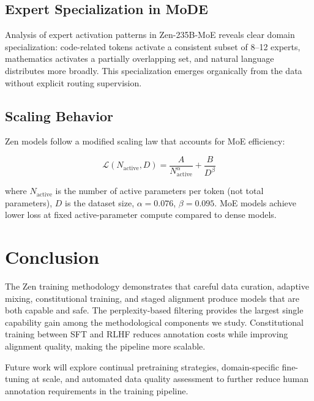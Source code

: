 \documentclass[11pt,a4paper]{article}
\begin{document}
\subsection{Expert Specialization in MoDE}

Analysis of expert activation patterns in Zen-235B-MoE reveals clear domain
specialization: code-related tokens activate a consistent subset of 8--12 experts,
mathematics activates a partially overlapping set, and natural language distributes
more broadly. This specialization emerges organically from the data without
explicit routing supervision.

\subsection{Scaling Behavior}

Zen models follow a modified scaling law that accounts for MoE efficiency:

\begin{equation}
\mathcal{L}(N_\text{active}, D) = \frac{A}{N_\text{active}^\alpha} + \frac{B}{D^\beta}
\end{equation}

where $N_\text{active}$ is the number of active parameters per token (not total
parameters), $D$ is the dataset size, $\alpha=0.076$, $\beta=0.095$. MoE models
achieve lower loss at fixed active-parameter compute compared to dense models.

\section{Conclusion}

The Zen training methodology demonstrates that careful data curation, adaptive mixing,
constitutional training, and staged alignment produce models that are both capable and
safe. The perplexity-based filtering provides the largest single capability gain
among the methodological components we study. Constitutional training between SFT and
RLHF reduces annotation costs while improving alignment quality, making the pipeline
more scalable.

Future work will explore continual pretraining strategies, domain-specific fine-tuning
at scale, and automated data quality assessment to further reduce human annotation
requirements in the training pipeline.
\end{document}
